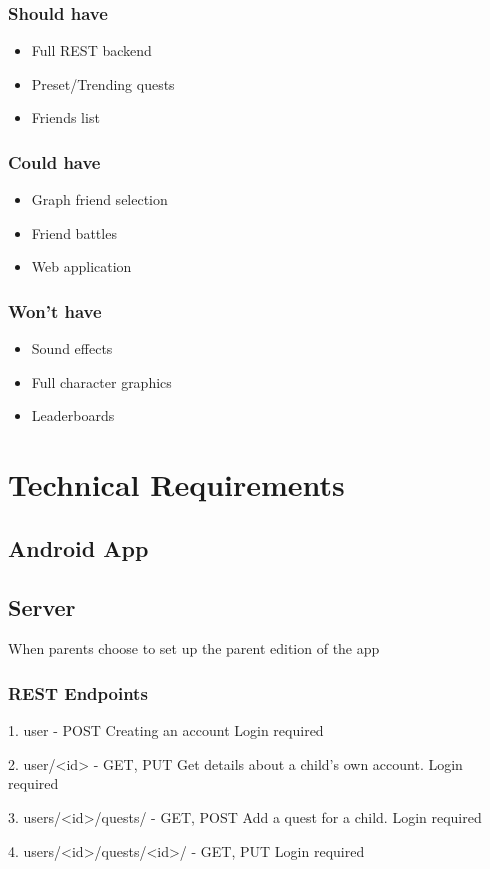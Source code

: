 \subsubsection{Should have}
\begin{itemize}
	\item Full REST backend
	\item Preset/Trending quests
	\item Friends list
\end{itemize}

\subsubsection{Could have}
\begin{itemize}
	\item Graph friend selection 
	\item Friend battles
	\item Web application
\end{itemize}

\subsubsection{Won't have}
\begin{itemize}
	\item Sound effects
	\item Full character graphics
	\item Leaderboards
\end{itemize}

\section{Technical Requirements}
\subsection{Android App}

\subsection{Server}
When parents choose to set up the parent edition of the app

\subsubsection{REST Endpoints}
1. user - POST
Creating an account
Login required

2. user/<id> - GET, PUT
Get details about a child's own account.
Login required

3. users/<id>/quests/ - GET, POST
Add a quest for a child.
Login required

4. users/<id>/quests/<id>/ - GET, PUT
Login required